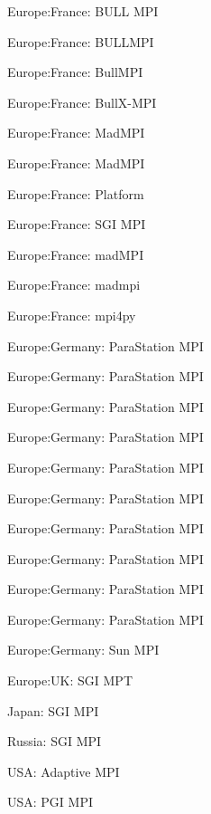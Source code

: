 \item Europe:France: BULL MPI
\item Europe:France: BULLMPI
\item Europe:France: BullMPI
\item Europe:France: BullX-MPI
\item Europe:France: MadMPI
\item Europe:France: MadMPI
\item Europe:France: Platform
\item Europe:France: SGI MPI
\item Europe:France: madMPI
\item Europe:France: madmpi
\item Europe:France: mpi4py
\item Europe:Germany: ParaStation MPI
\item Europe:Germany: ParaStation MPI
\item Europe:Germany: ParaStation MPI
\item Europe:Germany: ParaStation MPI
\item Europe:Germany: ParaStation MPI
\item Europe:Germany: ParaStation MPI
\item Europe:Germany: ParaStation MPI
\item Europe:Germany: ParaStation MPI
\item Europe:Germany: ParaStation MPI
\item Europe:Germany: ParaStation MPI
\item Europe:Germany: Sun MPI
\item Europe:UK: SGI MPT
\item Japan: SGI MPI
\item Russia: SGI MPI
\item USA: Adaptive MPI
\item USA: PGI MPI
